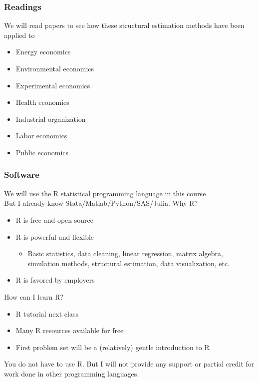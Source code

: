 \documentclass{beamer}
\begin{document}
\begin{frame}\frametitle{Readings}
    We will read papers to see how these structural estimation methods have been applied to
    \begin{itemize}
        \item Energy economics
        \item Environmental economics
        \item Experimental economics
        \item Health economics
        \item Industrial organization
        \item Labor economics
        \item Public economics
    \end{itemize}
\end{frame}

\begin{frame}\frametitle{Software}
    We will use the R statistical programming language in this course \\
    \vspace{1.5ex}
    But I already know Stata/Matlab/Python/SAS/Julia. Why R?
    \begin{itemize}
        \item R is free and open source
        \item R is powerful and flexible
        \begin{itemize}
            \item Basic statistics, data cleaning, linear regression, matrix algebra, simulation methods, structural estimation, data visualization, etc.
        \end{itemize}
        \item R is favored by employers
    \end{itemize}
    \vspace{1.5ex}
    How can I learn R?
    \begin{itemize}
        \item R tutorial next class
        \item Many R resources available for free
        \item First problem set will be a (relatively) gentle introduction to R
    \end{itemize}
    \vspace{1.5ex}
    You do not have to use R. But I will not provide any support or partial credit for work done in other programming languages.
\end{frame}
\end{document}
